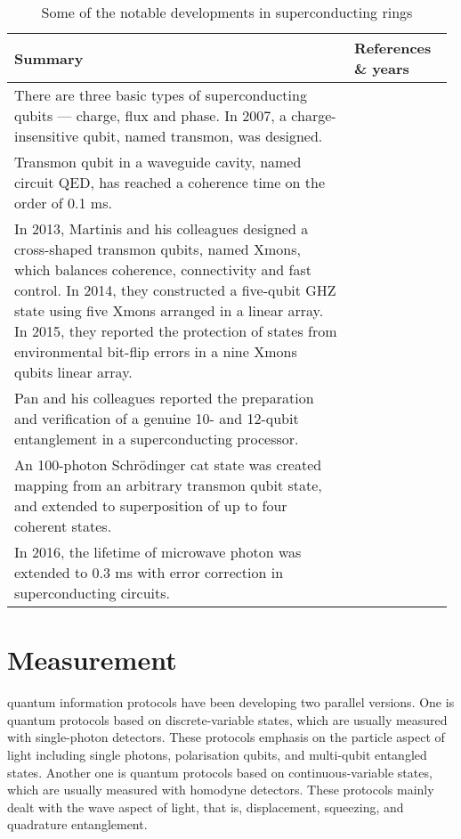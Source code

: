 \begin{table*}[!htbp]
	\begin{tabular}{|p{0.755\linewidth}|p{0.22\linewidth}|}
		\hline
		Summary & References \& years \\
		\hline \hline
		There are three basic types of superconducting qubits --- charge, flux and phase. In 2007, a charge-insensitive qubit, named transmon, was designed.  &  \cite{bib:koch2007charge} \\
		\hline
		 Transmon qubit in a waveguide cavity, named circuit QED, has reached a coherence time on the order of 0.1 ms. & \cite{bib:paik2011observation, bib:rigetti2012superconducting} \\
		\hline
		In 2013, Martinis and his colleagues designed a cross-shaped transmon qubits, named Xmons, which balances coherence, connectivity and fast control. In 2014, they constructed a five-qubit GHZ state using five Xmons arranged in a linear array. In 2015, they reported the protection of states from environmental bit-flip errors in a nine Xmons qubits linear array. &  \cite{bib:barends2013coherent, bib:barends2014superconducting, bib:kelly2015state} \\
		\hline
		Pan and his colleagues reported the preparation and verification of a genuine 10- and 12-qubit entanglement in a superconducting processor. & \cite{bib:gong2018genuine, bib:song201710} \\		
		\hline
		An 100-photon Schr{\"o}dinger cat state was created mapping from an arbitrary transmon qubit state, and extended to superposition of up to four coherent states. & \cite{bib:vlastakis2013deterministically} \\
		\hline
		In 2016, the lifetime of microwave photon was extended to 0.3 ms with error correction in superconducting circuits. &  \cite{bib:ofek2016extending} \\
		\hline
	\end{tabular}
	\captionspacetab \caption{Some of the notable developments in superconducting rings} \label{tab:superconducting}
\end{table*}

%
%

\section{Measurement} 

 quantum information protocols have been developing two parallel versions. One is quantum protocols based on discrete-variable states, which are usually measured with single-photon detectors. These protocols emphasis on the particle aspect of light including single photons, polarisation qubits, and multi-qubit entangled states. Another one is quantum protocols based on continuous-variable states, which are usually measured with homodyne detectors. These protocols mainly dealt with the wave aspect of light, that is, displacement, squeezing, and quadrature entanglement.

